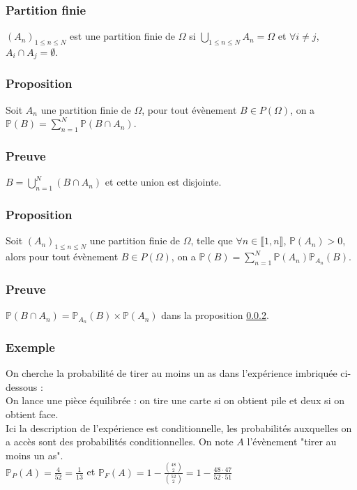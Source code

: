 \documentclass[a4paper,10pt]{book} %
\renewcommand{\P}{\mathbb{P}} %
\begin{document}
\subsubsection{Partition finie}
$(A_n)_{1\leq n\leq N}$ est une partition finie de $\Omega$ si $\bigcup_{1\leq n\leq N}A_n=\Omega$ et $\forall i\neq j$, $A_i\cap A_j=\emptyset$.

\subsubsection{Proposition}\label{proposition1.2.1}
Soit $A_n$ une partition finie de $\Omega$, pour tout évènement $B\in P(\Omega)$, on a $\P(B)=\sum_{n=1}^N\P(B\cap A_n)$.

\subsubsection{Preuve}
$B=\bigcup_{n=1}^N(B\cap A_n)$ et cette union est disjointe.

\subsubsection{Proposition}\label{proposition1.2.2}
Soit $(A_n)_{1\leq n\leq N}$ une partition finie de $\Omega$, telle que $\forall n\in \llbracket 1,n\rrbracket$, $\P(A_n)>0$, alors pour tout évènement $B\in P(\Omega)$, on a $\P(B)=\sum_{n=1}^N\P(A_n)\P_{A_n}(B)$.

\subsubsection{Preuve}
$\P(B\cap A_n)=\P_{A_n}(B)\times \P(A_n)$ dans la proposition \ref{proposition1.2.1}.

\subsubsection{Exemple}
On cherche la probabilité de tirer au moins un as dans l'expérience imbriquée ci-dessous :\\
On lance une pièce équilibrée : on tire une carte si on obtient pile et deux si on obtient face.\\

Ici la description de l'expérience est conditionnelle, les probabilités auxquelles on a accès sont des probabilités conditionnelles. On note $A$ l'évènement "tirer au moins un as".\\

$\P_P(A)=\frac{4}{52}=\frac{1}{13}$ et 
$\P_F(A)=1-\frac{\binom{48}{2}}{\binom{52}{2}}=1-\frac{48\cdot 47}{52\cdot 51}$\\
\end{document}
